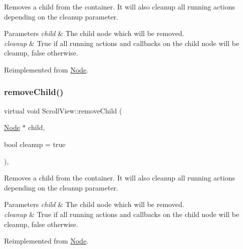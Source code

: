 Removes a child from the container. It will also cleanup all running actions depending on the cleanup parameter.


\begin{DoxyParams}{Parameters}
{\em child} & The child node which will be removed. \\
\hline
{\em cleanup} & True if all running actions and callbacks on the child node will be cleanup, false otherwise. \\
\hline
\end{DoxyParams}


Reimplemented from \hyperlink{classNode_a872d4a7d389b26b0c6ad7ed99c8b1b65}{Node}.

\mbox{\label{classScrollView_a10009c987a878297cabe629369142972}} 
\subsubsection{\texorpdfstring{remove\+Child()}{removeChild()}\hspace{0.1cm}{\footnotesize\ttfamily [2/2]}}
{\footnotesize\ttfamily virtual void Scroll\+View\+::remove\+Child (\begin{DoxyParamCaption}\item[{\hyperlink{classNode}{Node} $\ast$}]{child,  }\item[{bool}]{cleanup = {\ttfamily true} }\end{DoxyParamCaption})\hspace{0.3cm}{\ttfamily [override]}, {\ttfamily [virtual]}}

Removes a child from the container. It will also cleanup all running actions depending on the cleanup parameter.


\begin{DoxyParams}{Parameters}
{\em child} & The child node which will be removed. \\
\hline
{\em cleanup} & True if all running actions and callbacks on the child node will be cleanup, false otherwise. \\
\hline
\end{DoxyParams}


Reimplemented from \hyperlink{classNode_a872d4a7d389b26b0c6ad7ed99c8b1b65}{Node}.

\mbox{\label{classScrollView_ab8bc90e2fef0ba2e8ddf04778bb44dfe}} 
